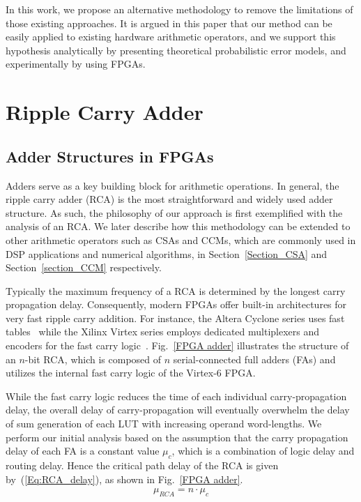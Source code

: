 \documentclass[prodmode,acmtrets]{acmsmall} %
\begin{document}
In this work, we propose an alternative methodology to remove the limitations of those existing approaches. It is argued in this paper that our method can be easily applied to existing hardware arithmetic operators, and we support this hypothesis analytically by presenting theoretical probabilistic error models, and experimentally by using FPGAs.

\section{Ripple Carry Adder}\label{section_RCA}
\subsection{Adder Structures in FPGAs}
Adders serve as a key building block for arithmetic operations. In general, the ripple carry adder (RCA) is the most straightforward and widely used adder structure. As such, the philosophy of our approach is first exemplified with the analysis of an RCA. We later describe how this methodology can be extended to other arithmetic operators such as CSAs and CCMs, which are commonly used in DSP applications and numerical algorithms, in Section~\ref{Section_CSA} and Section~\ref{section_CCM} respectively.

Typically the maximum frequency of a RCA is determined by the longest carry propagation delay. Consequently, modern FPGAs offer built-in architectures for very fast ripple carry addition. For instance, the Altera Cyclone series uses fast tables~\cite{AlteraCyclone} while the Xilinx Virtex series employs dedicated multiplexers and encoders for the fast carry logic~\cite{Virtex6}. Fig.~\ref{FPGA adder} illustrates the structure of an $n$-bit RCA, which is composed of $n$ serial-connected full adders (FAs) and utilizes the internal fast carry logic of the Virtex-6 FPGA.

While the fast carry logic reduces the time of each individual carry-propagation delay, the overall delay of carry-propagation will eventually overwhelm the delay of sum generation of each LUT with increasing operand word-lengths. We perform our initial analysis based on the assumption that the carry propagation delay of each FA is a constant value $\mu_c$, which is a combination of logic delay and routing delay. Hence the critical path delay of the RCA is given by~(\ref{Eq:RCA_delay}), as shown in Fig.~\ref{FPGA adder}.
%
\begin{eqnarray}\label{Eq:RCA_delay}
	\mu_{RCA}=n\cdot\mu_c
\end{eqnarray}
\end{document}
